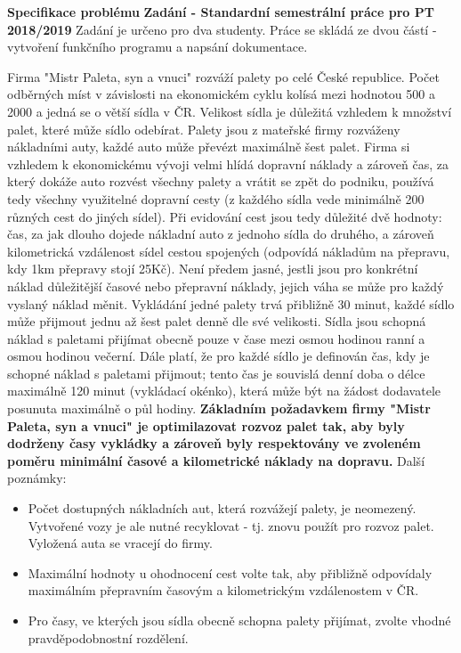 \documentclass[ 12pt, a4paper]{report}
\begin{document}
{\Large\bf\noindent Specifikace problému}\newline
{\large\bf Zadání - Standardní semestrální práce pro PT 2018/2019}\newline
Zadání je určeno pro dva studenty. Práce se skládá ze dvou částí - vytvoření funkčního programu a napsání dokumentace.
\newline
\par Firma "Mistr Paleta, syn a vnuci" rozváží palety po celé České republice. Počet odběrných míst v závislosti na ekonomickém cyklu kolísá mezi hodnotou 500 a 2000 a jedná se o větší sídla v ČR. Velikost sídla je důležitá vzhledem k množství palet, které může sídlo odebírat. Palety jsou z mateřské firmy rozváženy nákladními auty, každé auto může převézt maximálně šest palet. Firma si vzhledem k ekonomickému vývoji velmi hlídá dopravní náklady a zároveň čas, za který dokáže auto rozvést všechny palety a vrátit se zpět do podniku, používá tedy všechny využitelné dopravní cesty (z každého sídla vede minimálně 200 různých cest do jiných sídel). Při evidování cest jsou tedy důležité dvě hodnoty: čas, za jak dlouho dojede nákladní auto z jednoho sídla do druhého, a zároveň kilometrická vzdálenost sídel cestou spojených (odpovídá nákladům na přepravu, kdy 1km přepravy stojí 25Kč). Není předem jasné, jestli jsou pro konkrétní náklad důležitější časové nebo přepravní náklady, jejich váha se může pro každý vyslaný náklad měnit. Vykládání jedné palety trvá přibližně 30 minut, každé sídlo může přijmout jednu až šest palet denně dle své velikosti. Sídla jsou schopná náklad s paletami přijímat obecně pouze v čase mezi osmou hodinou ranní a osmou hodinou večerní. Dále platí, že pro každé sídlo je definován čas, kdy je schopné náklad s paletami přijmout; tento čas je souvislá denní doba o délce maximálně 120 minut (vykládací okénko), která může být na žádost dodavatele posunuta maximálně o půl hodiny. \textbf{Základním požadavkem firmy "Mistr Paleta, syn a vnuci" je optimilazovat rozvoz palet tak, aby byly dodrženy časy vykládky a zároveň byly respektovány ve zvoleném poměru minimální časové a kilometrické náklady na dopravu.}\newline
Další poznámky:\newline
\begin{itemize}
  \item Počet dostupných nákladních aut, která rozvážejí palety, je neomezený. Vytvořené vozy je ale nutné recyklovat - tj. znovu použít pro rozvoz palet. Vyložená auta se vracejí do firmy.
  \item Maximální hodnoty u ohodnocení cest volte tak, aby přibližně odpovídaly maximálním přepravním časovým a kilometrickým vzdálenostem v ČR.
  \item Pro časy, ve kterých jsou sídla obecně schopna palety přijímat, zvolte vhodné pravděpodobnostní rozdělení.
\end{itemize}
\end{document}
